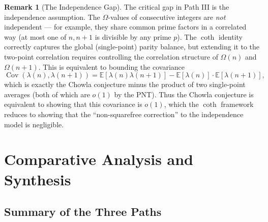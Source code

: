 \documentclass[11pt,a4paper]{article}
\theoremstyle{plain}
\theoremstyle{definition}
\newtheorem{remark}[theorem]{Remark}
\begin{document}
\begin{remark}[The Independence Gap]
The critical gap in Path III is the independence assumption. The $\Omega$-values of consecutive integers are \emph{not} independent --- for example, they share common prime factors in a correlated way (at most one of $n, n+1$ is divisible by any prime $p$). The $\coth$ identity correctly captures the global (single-point) parity balance, but extending it to the two-point correlation requires controlling the correlation structure of $\Omega(n)$ and $\Omega(n+1)$. This is equivalent to bounding the covariance
\[
\operatorname{Cov}(\lambda(n), \lambda(n+1)) = \mathbb{E}[\lambda(n)\lambda(n+1)] - \mathbb{E}[\lambda(n)] \cdot \mathbb{E}[\lambda(n+1)],
\]
which is exactly the Chowla conjecture minus the product of two single-point averages (both of which are $o(1)$ by the PNT). Thus the Chowla conjecture is equivalent to showing that this covariance is $o(1)$, which the $\coth$ framework reduces to showing that the ``non-squarefree correction'' to the independence model is negligible.
\end{remark}

\section{Comparative Analysis and Synthesis}

\subsection{Summary of the Three Paths}
\end{document}
